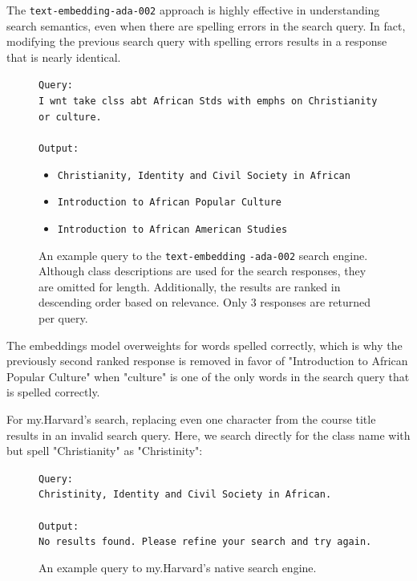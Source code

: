 \documentclass[
	a4paper, %
	10pt, %
	unnumberedsections, %
	twoside, %
]{LTJournalArticle}
\begin{document}
The \texttt{text-embedding-ada-002} approach is highly effective in understanding search semantics, even when there are spelling errors in the search query. In fact, modifying the previous search query with spelling errors results in a response that is nearly identical.

\begin{figure}[h]
	\begin{center}
		\texttt{Query:} \\
		\texttt{I wnt take clss abt African Stds with emphs on Christianity or culture.} \\
		\texttt{}\\
		\texttt{Output:} 
	\end{center}
\end{figure}

\begin{figure}
	\begin{center}
		\begin{itemize}
			\item \texttt{Christianity, Identity and Civil Society in African}
			\item \texttt{Introduction to African Popular Culture}
			\item \texttt{Introduction to African American Studies}
		\end{itemize}		
	\end{center}

	\caption{An example query to the \texttt{text-embedding} \texttt{-ada-002} search engine. Although class descriptions are used for the search responses, they are omitted for length. Additionally, the results are ranked in descending order based on relevance. Only 3 responses are returned per query.}
\end{figure}


The embeddings model overweights for words spelled correctly, which is why the previously second ranked response is removed in favor of "Introduction to African Popular Culture" when "culture" is one of the only words in the search query that is spelled correctly. 

For my.Harvard's search, replacing even one character from the course title results in an invalid search query. Here, we search directly for the class name with but spell "Christianity" as "Christinity": 


\begin{figure}[h]
	\begin{center}
		\texttt{Query:} \\
		\texttt{Christinity, Identity and Civil Society in African.} \\
		\texttt{}\\
		\texttt{Output: } \\
		\texttt{No results found. Please refine your search and try again. }\\
	\end{center}
	\label{fig:ex4}
	\caption{An example query to my.Harvard's native search engine.}
\end{figure}
\end{document}
